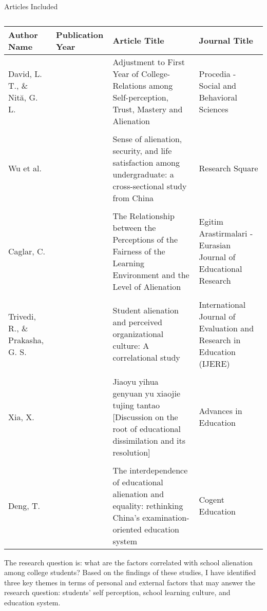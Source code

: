 \documentclass{scupi_apa_thesis}
\begin{document}
\begin{table}[h]
    \centering
    \caption{}
    \begin{flushleft}
        Articles Included
    \end{flushleft}
    \begin{tabularx}{\textwidth}{>{\hsize=0.7\hsize}X >{\hsize=0.5\hsize}X >{\hsize=1.8\hsize}X >{\hsize=1 \hsize}X}
        \toprule
        \textbf{Author Name} & \textbf{Publication Year} & \textbf{Article Title} & \textbf{Journal Title} \\
        \midrule
        David, L. T., \& Nită, G. L. & 2014 & Adjustment to First Year of College-Relations among Self-perception, Trust, Mastery and Alienation & Procedia - Social and Behavioral Sciences \\
        \\
        Wu et al. & 2024 & Sense of alienation, security, and life satisfaction among undergraduate: a cross-sectional study from China & Research Square \\
        \\
        Caglar, C. & 2013 & The Relationship between the Perceptions of the Fairness of the Learning Environment and the Level of Alienation & Egitim Arastirmalari - Eurasian Journal of Educational Research \\
        \\
        Trivedi, R., \& Prakasha, G. S. & 2021 & Student alienation and perceived organizational culture: A correlational study & International Journal of Evaluation and Research in Education (IJERE) \\
        \\
        Xia, X. & 2024 & Jiaoyu yihua genyuan yu xiaojie tujing tantao [Discussion on the root of educational dissimilation and its resolution] & Advances in Education \\
        \\
        Deng, T. & 2024 & The interdependence of educational alienation and equality: rethinking China's examination-oriented education system & Cogent Education \\
        \bottomrule
    \end{tabularx}
    \label{articles}
\end{table}

\par
The research question is: what are the factors correlated with school alienation among college students? 
Based on the findings of these studies, I have identified three key themes in terms of personal and external factors that may answer the research question: students’ self perception, school learning culture, and education system.
\end{document}
